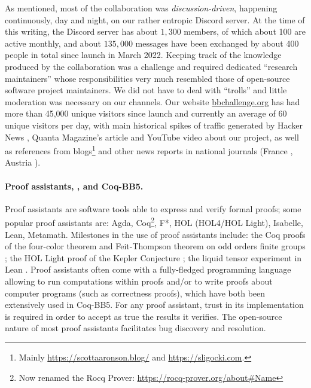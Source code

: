 \documentclass[a4paper,british]{article}
\theoremstyle{definition} %
\numberwithin{equation}{section}
\theoremstyle{definition} %
\newcommand{\CoqBB}{Coq-BB5\xspace}
\begin{document}
As mentioned, most of the collaboration was \textit{discussion-driven}, happening continuously, day and night, on our rather entropic Discord server. At the time of this writing, the Discord server has about $1{,}300$ members, of which about 100 are active monthly, and about $135{,}000$ messages have been exchanged by about 400 people in total since launch in March 2022. Keeping track of the knowledge produced by the collaboration was a challenge and required dedicated ``research maintainers'' whose responsibilities very much resembled those of open-source software project maintainers. We did not have to deal with ``trolls'' and little moderation was necessary on our channels. Our website \href{https://bbchallenge.or}{bbchallenge.org} has had more than 45,000 unique visitors since launch and currently an average of 60 unique visitors per day, with main historical spikes of traffic generated by Hacker News \cite{bmc7505_2023_busybeaver}, Quanta Magazine's article \cite{brubaker2024_bb5_quanta} and YouTube video \cite{quanta2025_busybeaver_video} about our project, as well as references from blogs\footnote{Mainly \url{https://scottaaronson.blog/} and \url{https://sligocki.com}.} and other news reports in national journals (France \cite{larousserie2024_castor}, Austria \cite{derstandard2025_fleissiger_biber}).















\paragraph{Proof assistants, \Coq, and \CoqBB.} Proof assistants are software tools able to express and verify formal proofs; some popular proof assistants are: Agda, Coq\footnote{Now renamed the Rocq Prover: \url{https://rocq-prover.org/about\#Name}}, F*, HOL (HOL4/HOL Light), Isabelle, Lean, Metamath. Milestones in the use of proof assistants include: the Coq proofs of the four-color theorem \cite{gonthier2008formal, gonthier2023computer} and Feit-Thompson theorem on odd orders finite groups \cite{gonthier2013machine}; the HOL Light proof of the Kepler Conjecture \cite{3fdf2c9143a54629bba02e34f24c7698}; the liquid tensor experiment in Lean \cite{2309.14870}. Proof assistants often come with a fully-fledged programming language allowing to run computations within proofs and/or to write proofs about computer programs (such as correctness proofs), which have both been extensively used in \CoqBB. For any proof assistant, trust in its implementation is required in order to accept as true the results it verifies. The open-source nature of most proof assistants facilitates bug discovery and resolution.
\end{document}
